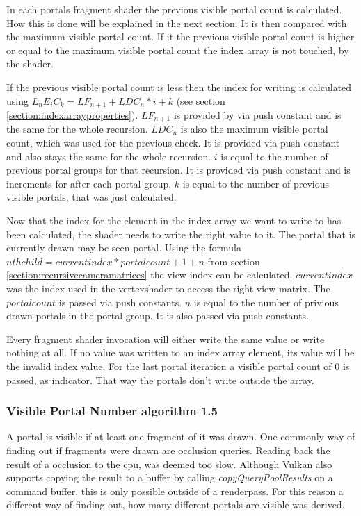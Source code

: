 In each portals fragment shader the previous visible portal count is calculated. How this is done will be explained in the next section. It is then compared with the maximum visible portal count. If it the previous visible portal count is higher or equal to the maximum visible portal count the index array is not touched, by the shader.

If the previous visible portal count is less then the index for writing is calculated using $L_nE_iC_k = LF_{n+1} + LDC_{n} * i + k$ (see section \ref{section:indexarrayproperties}). $LF_{n+1}$ is provided by via push constant and is the same for the whole recursion.  $LDC_{n}$ is also the maximum visible portal count, which was used for the previous check. It is provided via push constant and also stays the same for the whole recursion. $i$ is equal to the number of previous portal groups for that recursion. It is provided via push constant and is increments for after each portal group. $k$ is equal to the number of previous visible portals, that was just calculated.

Now that the index for the element in the index array we want to write to has been calculated, the shader needs to write the right value to it. The portal that is currently drawn may be seen portal. Using the formula  $ nth child = current index * portalcount + 1 + n$ from section \ref{section:recursivecameramatrices} the view index can be calculated.  $currentindex$ was the index used in the vertexshader to access the right view matrix. The $portalcount$ is passed via push constants. $n$ is equal to the number of privious drawn portals in the portal group. It is also passed via push constants.

Every fragment shader invocation will either write the same value or write nothing at all. If no value was written to an index array element, its value will be the invalid index value. For the last portal iteration a visible portal count of 0 is passed, as indicator. That way the portals don't write outside the array.

\subsubsection{Visible Portal Number algorithm 1.5}
\label{section:visibleportalcount}
A portal is visible if at least one fragment of it was drawn. One commonly way of finding out if fragments were drawn are occlusion queries. Reading back the result of a occlusion to the \gls{cpu}, was deemed too slow. Although Vulkan also supports copying the result to a buffer by calling \textit{copyQueryPoolResults} on a command buffer, this is only possible outside of a renderpass. For this reason a different way of finding out, how many different portals are visible was derived.


